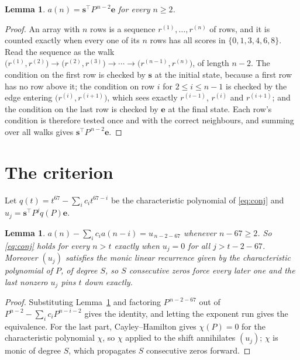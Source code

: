 \documentclass[11pt,a4paper]{article}
\theoremstyle{plain}
\newtheorem{lemma}[theorem]{Lemma}
\theoremstyle{definition}
\begin{document}
\begin{lemma}\label{lem:walk}
$a(n)=\mathbf{s}^{\!\top}P^{\,n-2}\mathbf{e}$ for every $n\ge2$.
\end{lemma}

\begin{proof}
An array with $n$ rows is a sequence $r^{(1)},\dots,r^{(n)}$ of rows, and it is counted
exactly when every one of its $n$ rows has all scores in $\{0,1,3,4,6,8\}$. Read the sequence as the
walk $\bigl(r^{(1)},r^{(2)}\bigr)\to\bigl(r^{(2)},r^{(3)}\bigr)\to\cdots\to
\bigl(r^{(n-1)},r^{(n)}\bigr)$, of length $n-2$. The condition on the first row is
checked by $\mathbf{s}$ at the initial state, because a first row has no row above it; the
condition on row $i$ for $2\le i\le n-1$ is checked by the edge entering
$\bigl(r^{(i)},r^{(i+1)}\bigr)$, which sees exactly $r^{(i-1)}$, $r^{(i)}$ and
$r^{(i+1)}$; and the condition on the last row is checked by $\mathbf{e}$ at the final
state. Each row's condition is therefore tested once and with the correct neighbours, and
summing over all walks gives $\mathbf{s}^{\!\top}P^{\,n-2}\mathbf{e}$.
\end{proof}

\section{The criterion}

Let $q(t)=t^{67}-\sum_i c_i t^{67-i}$ be the characteristic polynomial of
\eqref{eq:conj} and $u_j=\mathbf{s}^{\!\top}P^{j}q(P)\mathbf{e}$.

\begin{lemma}\label{lem:crit}
$a(n)-\sum_i c_i a(n-i)=u_{\,n-2-67}$ whenever $n-67\ge2$. So \eqref{eq:conj}
holds for every $n>t$ exactly when $u_j=0$ for all $j>t-2-67$. Moreover $(u_j)$
satisfies the monic linear recurrence given by the characteristic polynomial of $P$, of
degree $S$, so $S$ consecutive zeros force every later one and the last nonzero $u_j$ pins
$t$ down exactly.
\end{lemma}

\begin{proof}
Substituting Lemma~\ref{lem:walk} and factoring $P^{\,n-2-67}$ out of
$P^{n-2}-\sum_i c_i P^{n-i-2}$ gives the identity, and letting the exponent run gives the
equivalence. For the last part, Cayley--Hamilton gives $\chi(P)=0$ for the characteristic
polynomial $\chi$, so $\chi$ applied to the shift annihilates $(u_j)$; $\chi$ is monic of
degree $S$, which propagates $S$ consecutive zeros forward.
\end{proof}
\end{document}
